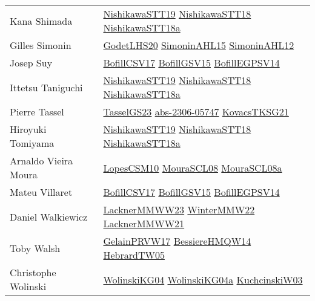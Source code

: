 {\begin{longtable}{p{4cm}p{20cm}}
Kana Shimada & \href{}{NishikawaSTT19}\cite{NishikawaSTT19} \href{papers/NishikawaSTT18.pdf}{NishikawaSTT18}\cite{NishikawaSTT18} \href{papers/NishikawaSTT18a.pdf}{NishikawaSTT18a}\cite{NishikawaSTT18a} \\
Gilles Simonin & \href{papers/GodetLHS20.pdf}{GodetLHS20}\cite{GodetLHS20} \href{articles/SimoninAHL15.pdf}{SimoninAHL15}\cite{SimoninAHL15} \href{papers/SimoninAHL12.pdf}{SimoninAHL12}\cite{SimoninAHL12} \\
Josep Suy & \href{papers/BofillCSV17.pdf}{BofillCSV17}\cite{BofillCSV17} \href{papers/BofillGSV15.pdf}{BofillGSV15}\cite{BofillGSV15} \href{papers/BofillEGPSV14.pdf}{BofillEGPSV14}\cite{BofillEGPSV14} \\
Ittetsu Taniguchi & \href{}{NishikawaSTT19}\cite{NishikawaSTT19} \href{papers/NishikawaSTT18.pdf}{NishikawaSTT18}\cite{NishikawaSTT18} \href{papers/NishikawaSTT18a.pdf}{NishikawaSTT18a}\cite{NishikawaSTT18a} \\
Pierre Tassel & \href{papers/TasselGS23.pdf}{TasselGS23}\cite{TasselGS23} \href{articles/abs-2306-05747.pdf}{abs-2306-05747}\cite{abs-2306-05747} \href{papers/KovacsTKSG21.pdf}{KovacsTKSG21}\cite{KovacsTKSG21} \\
Hiroyuki Tomiyama & \href{}{NishikawaSTT19}\cite{NishikawaSTT19} \href{papers/NishikawaSTT18.pdf}{NishikawaSTT18}\cite{NishikawaSTT18} \href{papers/NishikawaSTT18a.pdf}{NishikawaSTT18a}\cite{NishikawaSTT18a} \\
Arnaldo Vieira Moura & \href{articles/LopesCSM10.pdf}{LopesCSM10}\cite{LopesCSM10} \href{papers/MouraSCL08.pdf}{MouraSCL08}\cite{MouraSCL08} \href{papers/MouraSCL08a.pdf}{MouraSCL08a}\cite{MouraSCL08a} \\
Mateu Villaret & \href{papers/BofillCSV17.pdf}{BofillCSV17}\cite{BofillCSV17} \href{papers/BofillGSV15.pdf}{BofillGSV15}\cite{BofillGSV15} \href{papers/BofillEGPSV14.pdf}{BofillEGPSV14}\cite{BofillEGPSV14} \\
Daniel Walkiewicz & \href{articles/LacknerMMWW23.pdf}{LacknerMMWW23}\cite{LacknerMMWW23} \href{papers/WinterMMW22.pdf}{WinterMMW22}\cite{WinterMMW22} \href{papers/LacknerMMWW21.pdf}{LacknerMMWW21}\cite{LacknerMMWW21} \\
Toby Walsh & \href{papers/GelainPRVW17.pdf}{GelainPRVW17}\cite{GelainPRVW17} \href{papers/BessiereHMQW14.pdf}{BessiereHMQW14}\cite{BessiereHMQW14} \href{papers/HebrardTW05.pdf}{HebrardTW05}\cite{HebrardTW05} \\
Christophe Wolinski & \href{papers/WolinskiKG04.pdf}{WolinskiKG04}\cite{WolinskiKG04} \href{}{WolinskiKG04a}\cite{WolinskiKG04a} \href{articles/KuchcinskiW03.pdf}{KuchcinskiW03}\cite{KuchcinskiW03} \\

\end{longtable}}
